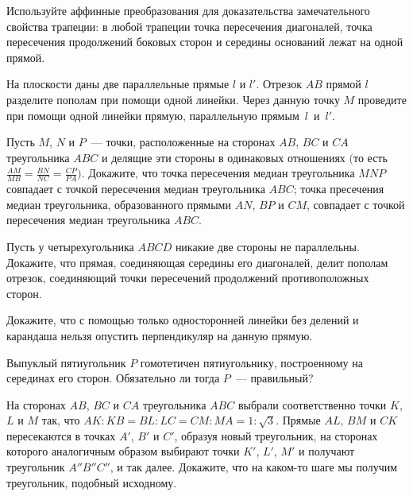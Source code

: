 \documentclass[a4paper,12pt]{article}
\begin{document}
 Используйте аффинные преобразования для доказательства 
замечательного свойства трапеции: в любой трапеции точка
пересечения диагоналей, точка пересечения продолжений боковых сторон
и середины оснований лежат на одной прямой. 

 На плоскости даны две параллельные прямые $l$ и $l'$.
  Отрезок $AB$ прямой $l$ разделите пополам при
помощи одной линейки.  Через данную точку $M$ проведите при
помощи одной линейки прямую, параллельную прямым~$l$~и~$l'$.

 Пусть $M$, $N$ и $P$~--- точки, расположенные на сторонах
$AB$, $BC$ и $CA$ треугольника $ABC$ и делящие эти стороны в
одинаковых отношениях $\biggl($то есть $\displaystyle\frac{AM}{MB} =
\frac{BN}{NC} = \frac{CP}{PA}\biggr)$. Докажите, что 
 точка пересечения медиан треугольника $MNP$ совпадает с
точкой пересечения медиан треугольника $ABC$;  точка
пресечения медиан треугольника, образованного прямыми $AN$, $BP$ и
$CM$, совпадает с точкой пересечения медиан треугольника $ABC$.

 Пусть у четырехугольника $ABCD$ никакие две стороны не
параллельны. Докажите, что прямая, соединяющая середины его
диагоналей, делит пополам отрезок, соединяющий точки пересечений
продолжений противоположных сторон. 

 Докажите, что с помощью только односторонней линейки без
делений и карандаша нельзя опустить перпендикуляр на данную прямую.

 Выпуклый пятиугольник $P$ гомотетичен пятиугольнику,
построенному на серединах его сторон. Обязательно ли тогда $P$~---
правильный? 

 На сторонах $AB$, $BC$ и $CA$ треугольника $ABC$ выбрали
соответственно точки $K$, $L$ и $M$ так, что $AK : KB = BL : LC = CM
: MA = 1 : \sqrt3$. Прямые $AL$, $BM$ и $CK$ пересекаются в точках
$A'$, $B'$ и $C'$, образуя новый треугольник, на сторонах которого
аналогичным образом выбирают точки $K'$, $L'$, $M'$ и получают
треугольник $A''B''C''$, и так далее. Докажите, что на каком-то шаге
мы получим треугольник, подобный исходному. 

\end{document}
